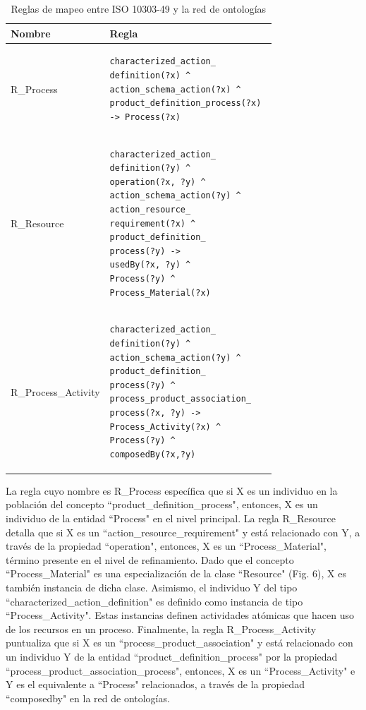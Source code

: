\documentclass[journal]{IEEEtran}
\begin{document}
\begin{table}[!t]
\renewcommand{\arraystretch}{1.3}
\caption{Reglas de mapeo entre ISO 10303-49 y la red de ontolog\'ias}
\label{tabla6}
\centering
\begin{tabular}{|p{2.5cm}|p{5cm}|}
\hline
\bfseries Nombre & \bfseries Regla \\
\hline
R\_Process & \begin{verbatim}characterized_action_
definition(?x) ^ 
action_schema_action(?x) ^ 
product_definition_process(?x) 
-> Process(?x) \end{verbatim}  \\ \cline{1-2}
R\_Resource & \begin{verbatim}characterized_action_
definition(?y) ^ 
operation(?x, ?y) ^ 
action_schema_action(?y) ^ 
action_resource_
requirement(?x) ^ 
product_definition_
process(?y) -> 
usedBy(?x, ?y) ^ 
Process(?y) ^ 
Process_Material(?x) \end{verbatim} \\ \cline{1-2}
R\_Process\_Activity & \begin{verbatim}characterized_action_
definition(?y) ^ 
action_schema_action(?y) ^ 
product_definition_
process(?y) ^ 
process_product_association_
process(?x, ?y) -> 
Process_Activity(?x) ^ 
Process(?y) ^ 
composedBy(?x,?y) \end{verbatim} \\  \hline   
\end{tabular}
\end{table}

La regla cuyo nombre es R\_Process espec\'ifica que si X es un individuo en la poblaci\'on del concepto ``product\_definition\_process", entonces, X es un individuo de la entidad ``Process" en el nivel principal. La regla R\_Resource detalla que si X es un ``action\_resource\_requirement" y est\'a relacionado con Y, a trav\'es de la propiedad ``operation", entonces, X es un ``Process\_Material", t\'ermino presente en el nivel de refinamiento. Dado que el concepto ``Process\_Material" es una especializaci\'on de la clase ``Resource" (Fig. 6), X es tambi\'en instancia de dicha clase. Asimismo, el individuo Y del tipo ``characterized\_action\_definition" es definido como instancia de tipo ``Process\_Activity". Estas instancias definen actividades at\'omicas que hacen uso de los recursos en un proceso. Finalmente, la regla R\_Process\_Activity puntualiza que si X es un ``process\_product\_association" y est\'a relacionado con un individuo Y de la entidad ``product\_definition\_process" por la propiedad ``process\_product\_association\_process", entonces, X es un ``Process\_Activity" e Y es el equivalente a ``Process" relacionados, a trav\'es de la propiedad ``composedby" en la red de ontolog\'ias. 
\end{document}
